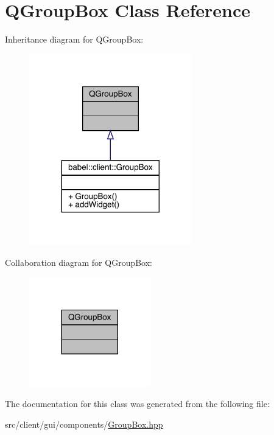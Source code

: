 \hypertarget{class_q_group_box}{}\section{Q\+Group\+Box Class Reference}
\label{class_q_group_box}


Inheritance diagram for Q\+Group\+Box\+:\nopagebreak
\begin{figure}[H]
\begin{center}
\leavevmode
\includegraphics[width=200pt]{class_q_group_box__inherit__graph}
\end{center}
\end{figure}


Collaboration diagram for Q\+Group\+Box\+:\nopagebreak
\begin{figure}[H]
\begin{center}
\leavevmode
\includegraphics[width=149pt]{class_q_group_box__coll__graph}
\end{center}
\end{figure}


The documentation for this class was generated from the following file\+:\begin{DoxyCompactItemize}
\item 
src/client/gui/components/\mbox{\hyperlink{_group_box_8hpp}{Group\+Box.\+hpp}}\end{DoxyCompactItemize}

